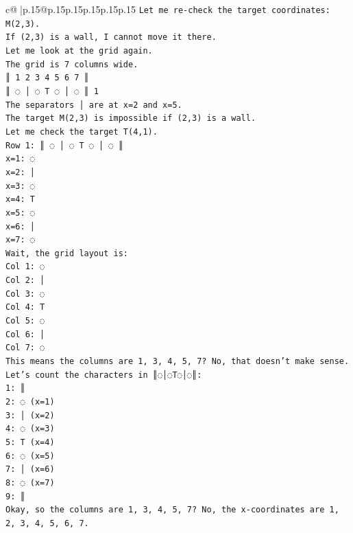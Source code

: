 \documentclass{article}
\begin{document}
{\begin{supertabular}{c@{$\;$}|p{.15\linewidth}@{}p{.15\linewidth}p{.15\linewidth}p{.15\linewidth}p{.15\linewidth}p{.15\linewidth}}
{{{\texttt{Let me re{-}check the target coordinates: M(2,3).} \\
\texttt{If (2,3) is a wall, I cannot move it there.} \\
\texttt{Let me look at the grid again.} \\
\texttt{The grid is 7 columns wide.} \\
\texttt{║ 1 2 3 4 5 6 7 ║} \\
\texttt{║ ◌ │ ◌ T ◌ │ ◌ ║ 1} \\
\texttt{The separators │ are at x=2 and x=5.} \\
\texttt{The target M(2,3) is impossible if (2,3) is a wall.} \\
\texttt{Let me check the target T(4,1).} \\
\texttt{Row 1: ║ ◌ │ ◌ T ◌ │ ◌ ║} \\
\texttt{x=1: ◌} \\
\texttt{x=2: │} \\
\texttt{x=3: ◌} \\
\texttt{x=4: T} \\
\texttt{x=5: ◌} \\
\texttt{x=6: │} \\
\texttt{x=7: ◌} \\
\texttt{Wait, the grid layout is:} \\
\texttt{Col 1: ◌} \\
\texttt{Col 2: │} \\
\texttt{Col 3: ◌} \\
\texttt{Col 4: T} \\
\texttt{Col 5: ◌} \\
\texttt{Col 6: │} \\
\texttt{Col 7: ◌} \\
\texttt{This means the columns are 1, 3, 4, 5, 7? No, that doesn't make sense.} \\
\texttt{Let's count the characters in ║◌│◌T◌│◌║:} \\
\texttt{1: ║} \\
\texttt{2: ◌ (x=1)} \\
\texttt{3: │ (x=2)} \\
\texttt{4: ◌ (x=3)} \\
\texttt{5: T (x=4)} \\
\texttt{6: ◌ (x=5)} \\
\texttt{7: │ (x=6)} \\
\texttt{8: ◌ (x=7)} \\
\texttt{9: ║} \\
\texttt{Okay, so the columns are 1, 3, 4, 5, 7? No, the x{-}coordinates are 1, 2, 3, 4, 5, 6, 7.} \\
}}}
\end{supertabular}}
\end{document}
